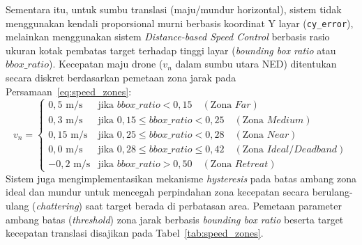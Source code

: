Sementara itu, untuk sumbu translasi (maju/mundur horizontal), sistem tidak menggunakan kendali proporsional murni berbasis koordinat Y layar (\texttt{cy\_error}), melainkan menggunakan sistem \textit{Distance-based Speed Control} berbasis rasio ukuran kotak pembatas target terhadap tinggi layar (\textit{bounding box ratio} atau $bbox\_ratio$). Kecepatan maju drone ($v_n$ dalam sumbu utara NED) ditentukan secara diskret berdasarkan pemetaan zona jarak pada Persamaan~\ref{eq:speed_zones}:
\begin{equation}
	\label{eq:speed_zones}
	v_n = \begin{cases} 
		0,5\text{ m/s} & \text{jika } bbox\_ratio < 0,15 \quad (\text{Zona } \textit{Far}) \\
		0,3\text{ m/s} & \text{jika } 0,15 \le bbox\_ratio < 0,25 \quad (\text{Zona } \textit{Medium}) \\
		0,15\text{ m/s} & \text{jika } 0,25 \le bbox\_ratio < 0,28 \quad (\text{Zona } \textit{Near}) \\
		0,0\text{ m/s} & \text{jika } 0,28 \le bbox\_ratio \le 0,42 \quad (\text{Zona } \textit{Ideal/Deadband}) \\
		-0,2\text{ m/s} & \text{jika } bbox\_ratio > 0,50 \quad (\text{Zona } \textit{Retreat}) 
	\end{cases}
\end{equation}
Sistem juga mengimplementasikan mekanisme \textit{hysteresis} pada batas ambang zona ideal dan mundur untuk mencegah perpindahan zona kecepatan secara berulang-ulang (\textit{chattering}) saat target berada di perbatasan area. Pemetaan parameter ambang batas (\textit{threshold}) zona jarak berbasis \textit{bounding box ratio} beserta target kecepatan translasi disajikan pada Tabel~\ref{tab:speed_zones}.

